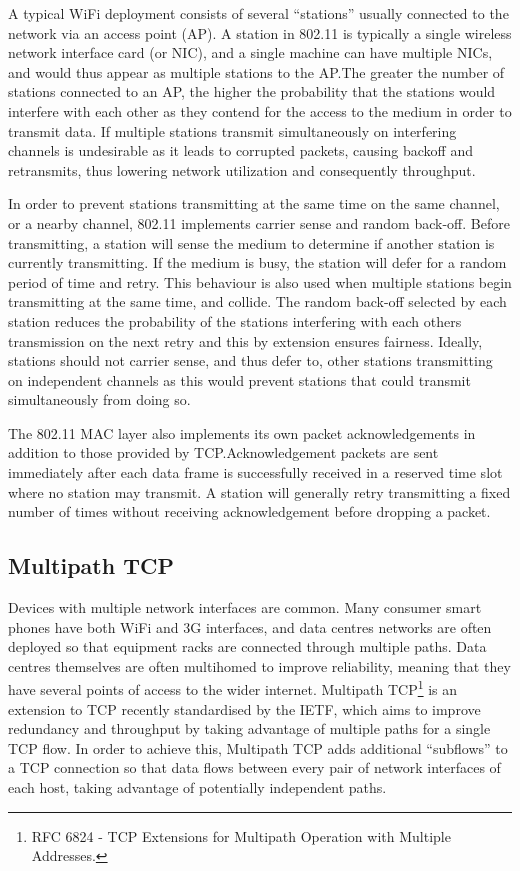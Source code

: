 A typical WiFi deployment consists of several ``stations'' usually connected to
the network via an access point (AP). A station in 802.11 is typically a single
wireless network interface card (or NIC), and a single machine can have multiple
NICs, and would thus appear as multiple stations to the AP.\@ The greater the
number of stations connected to an AP, the higher the probability that the
stations would interfere with each other as they contend for the access to the
medium in order to transmit data. If multiple stations transmit simultaneously
on interfering channels is undesirable as it leads to corrupted packets, causing
backoff and retransmits, thus lowering network utilization and consequently
throughput.

In order to prevent stations transmitting at the same time on the same channel,
or a nearby channel, 802.11 implements carrier sense and random back-off. Before
transmitting, a station will sense the medium to determine if another station is
currently transmitting. If the medium is busy, the station will defer for a
random period of time and retry. This behaviour is also used when multiple
stations begin transmitting at the same time, and collide. The random back-off
selected by each station reduces the probability of the stations interfering
with each others transmission on the next retry and this by extension ensures
fairness. Ideally, stations should not carrier sense, and thus defer to, other
stations transmitting on independent channels as this would prevent stations
that could transmit simultaneously from doing so.

The 802.11 MAC layer also implements its own packet acknowledgements in addition
to those provided by TCP.\@ Acknowledgement packets are sent immediately after
each data frame is successfully received in a reserved time slot where no station
may transmit. A station will generally retry transmitting a fixed number of times
without receiving acknowledgement before dropping a packet.

\subsection{Multipath TCP}
\label{sec:bg:mptcp}
Devices with multiple network interfaces are common. Many consumer smart phones
have both WiFi and 3G interfaces, and data centres networks are often deployed
so that equipment racks are connected through multiple paths. Data centres
themselves are often multihomed to improve reliability, meaning that they have
several points of access to the wider internet. Multipath TCP\footnote{RFC 6824
 - TCP Extensions for Multipath Operation with Multiple Addresses.} is an
extension to TCP recently standardised by the IETF, which aims to improve
redundancy and throughput by taking advantage of multiple paths for a single
TCP flow. In order to achieve this, Multipath TCP adds additional ``subflows''
to a TCP connection so that data flows between every pair of network
interfaces of each host, taking advantage of potentially independent paths.


